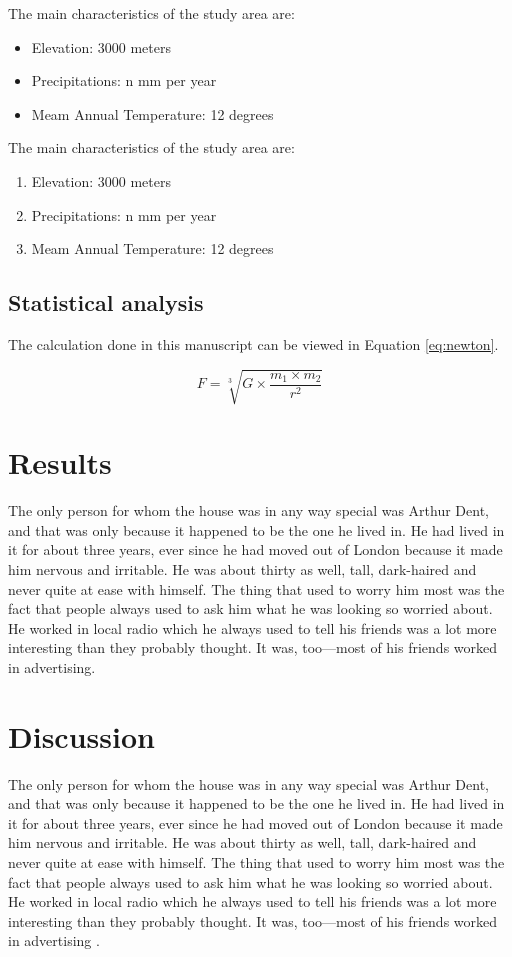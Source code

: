 \noindent The main characteristics of the study area are:
\begin{itemize}
    \item Elevation: 3000 meters
    \item Precipitations: n mm per year
    \item Meam Annual Temperature: 12 degrees
\end{itemize}

\noindent The main characteristics of the study area are:
\begin{enumerate}
    \item Elevation: 3000 meters
    \item Precipitations: n mm per year
    \item Meam Annual Temperature: 12 degrees
\end{enumerate}

\subsection{Statistical analysis}
The calculation done in this manuscript can be viewed in Equation \ref{eq:newton}.

\begin{equation}
    F = \sqrt[3]{G \times \frac{m_1 \times m_2}{r^2}}
    \label{eq:newton}
\end{equation}


\section{Results}

The only person for whom the house was in any way special was Arthur Dent, and that was only because it happened to be the one he lived in. He had lived in it for about three years, ever since he had moved out of London because it made him nervous and irritable. He was about thirty as well, tall, dark-haired and never quite at ease with himself. The thing that used to worry him most was the fact that people always used to ask him what he was looking so worried about. He worked in local radio which he always used to tell his friends was a lot more interesting than they probably thought. It was, too—most of his friends worked in advertising.


\section{Discussion}
The only person for whom the house was in any way special was Arthur Dent, and that was only because it happened to be the one he lived in. He had lived in it for about three years, ever since he had moved out of London because it made him nervous and irritable. He was about thirty as well, tall, dark-haired and never quite at ease with himself. The thing that used to worry him most was the fact that people always used to ask him what he was looking so worried about. He worked in local radio which he always used to tell his friends was a lot more interesting than they probably thought. It was, too—most of his friends worked in advertising \citep{yoccoz2001}.

